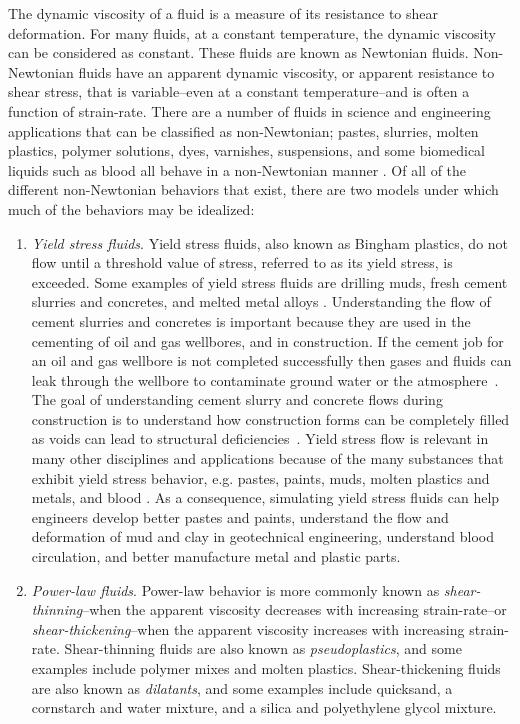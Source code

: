 \documentclass{article}
\begin{document}
The dynamic viscosity of a fluid is a measure of its resistance to shear deformation.
For many fluids, at a constant temperature, the dynamic viscosity can be considered as constant.
These fluids are known as Newtonian fluids.
Non-Newtonian fluids have an apparent dynamic viscosity, or apparent resistance to shear stress, that is variable--even at a constant temperature--and is often a function of strain-rate.
There are a number of fluids in science and engineering applications that can be classified as non-Newtonian; pastes, slurries, molten plastics, polymer solutions, dyes, varnishes, suspensions, and some biomedical liquids such as blood all behave in a non-Newtonian manner \cite{bohme1987non}.
Of all of the different non-Newtonian behaviors that exist, there are two models under which much of the behaviors may be idealized:
\begin{enumerate}
	\item \emph{Yield stress fluids}. Yield stress fluids, also known as Bingham plastics, do not flow until a threshold value of stress, referred to as its yield stress, is exceeded.
	Some examples of yield stress fluids are drilling muds, fresh cement slurries and concretes, and melted metal alloys \cite{ginzburg2002free}.
	Understanding the flow of cement slurries and concretes is important because they are used in the cementing of oil and gas wellbores, and in construction.
	If the cement job for an oil and gas wellbore is not completed successfully then gases and fluids can leak through the wellbore to contaminate ground water or the atmosphere~\cite{grasinger2015simulation}. %
	The goal of understanding cement slurry and concrete flows during construction is to understand how construction forms can be completely filled as voids can lead to structural deficiencies~\cite{definitely cite someone}.
	Yield stress flow is relevant in many other disciplines and applications because of the many substances that exhibit yield stress behavior, e.g. pastes, paints, muds, molten plastics and metals, and blood \cite{wang2011lattice}. %
	As a consequence, simulating yield stress fluids can help engineers develop better pastes and paints, understand the flow and deformation of mud and clay in geotechnical engineering, understand blood circulation, and better manufacture metal and plastic parts.
	
	\item \emph{Power-law fluids}. Power-law behavior is more commonly known as \emph{shear-thinning}--when the apparent viscosity decreases with increasing strain-rate--or \emph{shear-thickening}--when the apparent viscosity increases with increasing strain-rate. Shear-thinning fluids are also known as \emph{pseudoplastics}, and some examples include polymer mixes and molten plastics.
	Shear-thickening fluids are also known as \emph{dilatants}, and some examples include quicksand, a cornstarch and water mixture, and a silica and polyethylene glycol mixture.
\end{enumerate}
\end{document}
